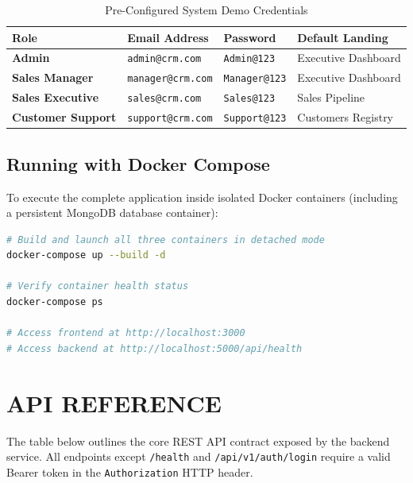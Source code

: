 \begin{table}[h!]
\centering
\caption{Pre-Configured System Demo Credentials}
\label{tab:demo_creds}
\renewcommand{\arraystretch}{1.3}
\begin{tabular}{|p{3.5cm}|p{5cm}|p{3cm}|p{3cm}|}
\hline
\textbf{Role} & \textbf{Email Address} & \textbf{Password} & \textbf{Default Landing} \\ \hline
\textbf{Admin} & \texttt{admin@crm.com} & \texttt{Admin@123} & Executive Dashboard \\ \hline
\textbf{Sales Manager} & \texttt{manager@crm.com} & \texttt{Manager@123} & Executive Dashboard \\ \hline
\textbf{Sales Executive} & \texttt{sales@crm.com} & \texttt{Sales@123} & Sales Pipeline \\ \hline
\textbf{Customer Support} & \texttt{support@crm.com} & \texttt{Support@123} & Customers Registry \\ \hline
\end{tabular}
\end{table}

\section{Running with Docker Compose}
To execute the complete application inside isolated Docker containers (including a persistent MongoDB database container):
\begin{lstlisting}[language=bash]
# Build and launch all three containers in detached mode
docker-compose up --build -d

# Verify container health status
docker-compose ps

# Access frontend at http://localhost:3000
# Access backend at http://localhost:5000/api/health
\end{lstlisting}

\chapter{API REFERENCE}
\label{app:api}

The table below outlines the core REST API contract exposed by the backend service. All endpoints except \texttt{/health} and \texttt{/api/v1/auth/login} require a valid Bearer token in the \texttt{Authorization} HTTP header.

